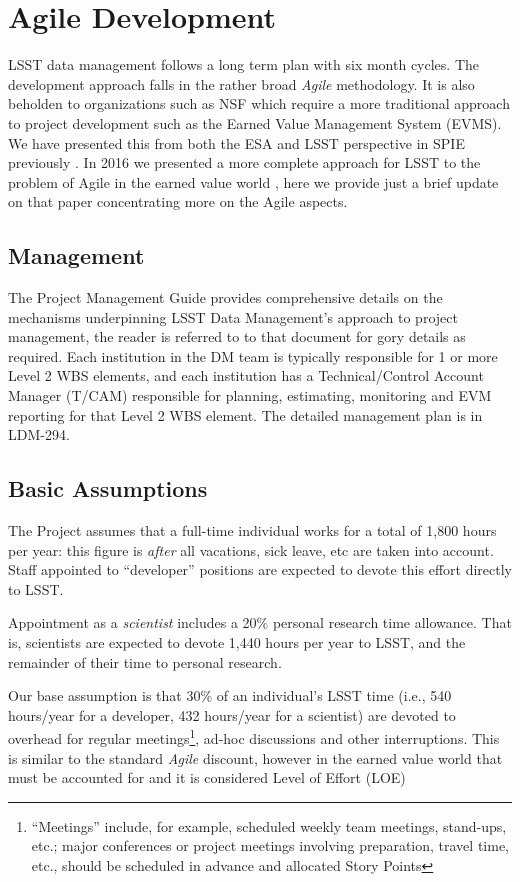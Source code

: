 \section{Agile Development}\label{sec:agile}

LSST data management follows a long term plan with six month cycles. The  development approach falls in the rather  broad \emph{Agile} methodology. It is also beholden to organizations such as NSF which require a more traditional approach to project development such as the Earned Value Management System (EVMS).
We have presented this from both  the ESA and LSST perspective in SPIE previously  \cite{2014SPIE.9150E..1EG}.
In 2016  we presented a more complete approach for LSST to the problem of Agile in the earned value world \cite{2016SPIE.9911E..0NK}, here we provide just a brief update on that paper concentrating more on the Agile aspects.


\subsection{Management}
The Project Management Guide \cite{DMTN-020} provides  comprehensive details on the mechanisms underpinning LSST Data Management’s approach to project management, the reader is referred to to that document for gory details as required.
Each institution in the DM team is typically
responsible for 1 or more Level 2 WBS elements, and each institution has a Technical/Control Account Manager
(T/CAM) responsible for planning, estimating, monitoring and EVM reporting for that Level 2 WBS element.
The detailed management plan is in LDM-294\cite{LDM-294}.

\subsection{Basic Assumptions}
The Project assumes that a full-time individual works for a total of
1,800 hours per year: this figure is \emph{after} all vacations, sick
leave, etc are taken into account. Staff appointed to ``developer''
positions are expected to devote this effort directly to LSST.

Appointment as a \emph{scientist} includes a 20\% personal research time
allowance. That is, scientists are expected to devote 1,440 hours per
year to LSST, and the remainder of their time to personal research.

Our base assumption is that 30\% of an individual's LSST time (i.e., 540 hours/year for a developer, 432 hours/year for a scientist) are devoted to overhead for regular meetings\footnote{``Meetings'' include, for example, scheduled weekly team meetings, stand-ups, etc.; major conferences or project meetings involving preparation, travel time, etc., should be scheduled in advance and allocated Story Points}, ad-hoc discussions and other interruptions.
This is similar to the standard \emph{Agile} discount, however in the earned value world that must be accounted for and it is considered Level of Effort (LOE)


